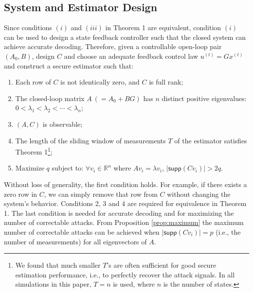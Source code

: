 \documentclass[twocolumn]{autart}    %
\newcommand{\rev}[1]{{\normalsize{{{\color{blue}#1}}}}}
\begin{document}
\subsection{System and \rev{Estimator} Design}\label{sec:decoder_design}
\vspace{-0.4cm}
Since conditions $(i)$ and $(iii)$ in Theorem 1 are equivalent, condition $(i)$ can be used to design a state feedback controller such that the closed system can achieve accurate decoding. Therefore, given a controllable open-loop pair $(A_0,B)$, design $C$ and choose an adequate feedback control law $u^{(t)} = G x^{(t)}$ and construct a secure \rev{estimator} such that:
\vspace{-0.2cm}
\begin{enumerate}
	\item Each row of $C$ is not identically zero, and $C$ is full rank;
	\item The closed-loop matrix $A~(=A_0+BG)$ has $n$ distinct positive eigenvalues: $0< \lambda_1 < \lambda_2 < \cdots < \lambda _n$;
	\item $(A,C)$ is observable;
	\item The length of the sliding window of measurements $T$ of the \rev{estimator} satisfies Theorem 1\footnote{We found that much smaller $T$'s are often sufficient for good secure estimation performance, i.e., to perfectly recover the attack signals. In all simulations in this paper, $T=n$ is used, where $n$ is the number of states.};
	\item Maximize $q$ subject to: $\forall v_i \in \mathbb{R}^n$ where $Av_i = \lambda v_i$, $\lvert \textsf{supp} (C v_i)  \rvert > 2q$.
\end{enumerate}
Without loss of generality, the first condition holds. For example, if there exists a zero row in $C$, we can simply remove that row from $C$ without changing the system's behavior. Conditions 2, 3 and 4 are required for equivalence in Theorem 1. The last condition is needed for accurate decoding and for maximizing the number of correctable attacks. From Proposition \ref{prop:maximum} the maximum number of correctable \rev{attacks} can be achieved when $\lvert \textsf{supp} (C v_i)  \rvert = p$ (i.e., the number of measurements) for all eigenvectors of $A$. 
\\
\end{document}
